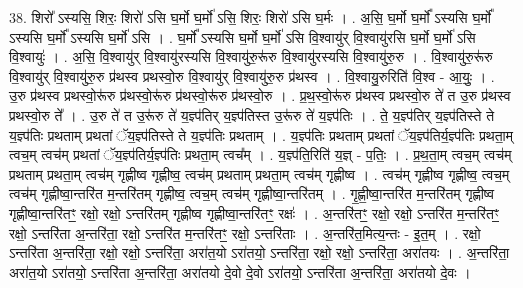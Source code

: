 \documentclass[17pt]{extarticle}
\begin{document}
38. शिरो᳚ ऽस्यसि॒ शिरः॒ शिरो॑ ऽसि घ॒र्मो घ॒र्मो॑ ऽसि॒ शिरः॒ शिरो॑ ऽसि घ॒र्मः । . अ॒सि॒ घ॒र्मो घ॒र्मो᳚ ऽस्यसि घ॒र्मो᳚ ऽस्यसि घ॒र्मो᳚ ऽस्यसि घ॒र्मो॑ ऽसि । . घ॒र्मो᳚ ऽस्यसि घ॒र्मो घ॒र्मो॑ ऽसि वि॒श्वायु॑र् वि॒श्वायु॑रसि घ॒र्मो घ॒र्मो॑ ऽसि वि॒श्वायुः॑ । . अ॒सि॒ वि॒श्वायु॑र् वि॒श्वायु॑रस्यसि वि॒श्वायु॑रु॒रू॑रु वि॒श्वायु॑रस्यसि वि॒श्वायु॑रु॒रु । . वि॒श्वायु॑रु॒रू॑रु वि॒श्वायु॑र् वि॒श्वायु॑रु॒रु प्र॑थस्व प्रथस्वो॒रु वि॒श्वायु॑र् वि॒श्वायु॑रु॒रु प्र॑थस्व । . वि॒श्वायु॒रुरिति॑ वि॒श्व - आ॒युः॒ । . उ॒रु प्र॑थस्व प्रथस्वो॒रू॑रु प्र॑थस्वो॒रू॑रु प्र॑थस्वो॒रू॑रु प्र॑थस्वो॒रु । . प्र॒थ॒स्वो॒रू॑रु प्र॑थस्व प्रथस्वो॒रु ते॑ त उ॒रु प्र॑थस्व प्रथस्वो॒रु ते᳚ । . उ॒रु ते॑ त उ॒रू॑रु ते॑ य॒ज्ञ्प॑तिर् य॒ज्ञ्प॑तिस्त उ॒रू॑रु ते॑ य॒ज्ञ्प॑तिः । . ते॒ य॒ज्ञ्प॑तिर् य॒ज्ञ्प॑तिस्ते ते य॒ज्ञ्प॑तिः प्रथताम् प्रथतां ॅय॒ज्ञ्प॑तिस्ते ते य॒ज्ञ्प॑तिः प्रथताम् । . य॒ज्ञ्प॑तिः प्रथताम् प्रथतां ॅय॒ज्ञ्प॑तिर्य॒ज्ञ्प॑तिः प्रथता॒म् त्वच॒म् त्वच॑म् प्रथतां ॅय॒ज्ञ्प॑तिर्य॒ज्ञ्प॑तिः प्रथता॒म् त्वच᳚म् । . य॒ज्ञ्प॑ति॒रिति॑ य॒ज्ञ् - प॒तिः॒ । . प्र॒थ॒ता॒म् त्वच॒म् त्वच॑म् प्रथताम् प्रथता॒म् त्वच॑म् गृह्णीष्व गृह्णीष्व॒ त्वच॑म् प्रथताम् प्रथता॒म् त्वच॑म् गृह्णीष्व । . त्वच॑म् गृह्णीष्व गृह्णीष्व॒ त्वच॒म् त्वच॑म् गृह्णीष्वा॒न्तरि॑त म॒न्तरि॑तम् गृह्णीष्व॒ त्वच॒म् त्वच॑म् गृह्णीष्वा॒न्तरि॑तम् । . गृ॒ह्णी॒ष्वा॒न्तरि॑त म॒न्तरि॑तम् गृह्णीष्व गृह्णीष्वा॒न्तरि॑तꣳ॒॒ रक्षो॒ रक्षो॒ ऽन्तरि॑तम् गृह्णीष्व गृह्णीष्वा॒न्तरि॑तꣳ॒॒ रक्षः॑ । . अ॒न्तरि॑तꣳ॒॒ रक्षो॒ रक्षो॒ ऽन्तरि॑त म॒न्तरि॑तꣳ॒॒ रक्षो॒ ऽन्तरि॑ता अ॒न्तरि॑ता॒ रक्षो॒ ऽन्तरि॑त म॒न्तरि॑तꣳ॒॒ रक्षो॒ ऽन्तरि॑ताः । . अ॒न्तरि॑त॒मित्य॒न्तः - इ॒त॒म् । . रक्षो॒ ऽन्तरि॑ता अ॒न्तरि॑ता॒ रक्षो॒ रक्षो॒ ऽन्तरि॑ता॒ अरा॑त॒यो ऽरा॑तयो॒ ऽन्तरि॑ता॒ रक्षो॒ रक्षो॒ ऽन्तरि॑ता॒ अरा॑तयः । . अ॒न्तरि॑ता॒ अरा॑त॒यो ऽरा॑तयो॒ ऽन्तरि॑ता अ॒न्तरि॑ता॒ अरा॑तयो दे॒वो दे॒वो ऽरा॑तयो॒ ऽन्तरि॑ता अ॒न्तरि॑ता॒ अरा॑तयो दे॒वः । \newline
\end{document}

